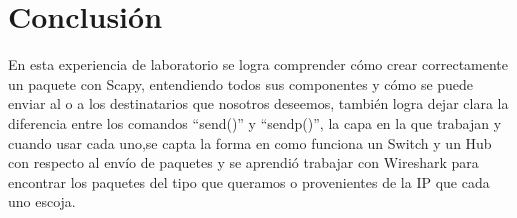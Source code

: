 \documentclass{udpreport}
\begin{document}
 	     
	      

\chapter{Conclusión}
  	      En esta experiencia de laboratorio se logra comprender cómo crear correctamente un paquete con Scapy,
  	      entendiendo todos sus componentes y cómo se puede enviar al o a los destinatarios que nosotros deseemos, también
  	      logra dejar clara la diferencia entre los comandos “send()” y “sendp()”, la capa en la que trabajan y cuando usar cada
  	      uno,se capta la forma en como funciona un Switch y un Hub con respecto al envío de paquetes y se aprendió trabajar con
  	      Wireshark para encontrar los paquetes del tipo que queramos o provenientes de la IP que cada uno  escoja.
\begin{thebibliography}{x}

\end{thebibliography}
\end{document}
